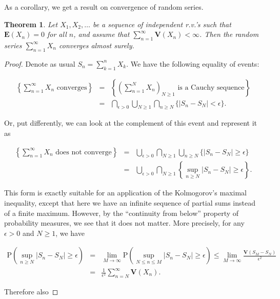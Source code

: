 \documentclass[11pt]{report}
\theoremstyle{plain}
\newtheorem{thm}{Theorem}[chapter]
\theoremstyle{definition}
\begin{document}
\noindent As a corollary, we get a result on convergence of
random series.

\begin{thm}
\label{thm-one-series}
Let $X_1,X_2,\ldots$ be a sequence of independent
r.v.'s such that $\mathbf{E}(X_n)=0$ for all $n$, and
assume that
$\sum_{n=1}^\infty \mathbf{V}(X_n) < \infty$. Then
the random series $\sum_{n=1}^\infty X_n$ converges
almost surely.
\end{thm}

\begin{proof}
Denote as usual $S_n = \sum_{k=1}^n X_k$. We have the
following equality of events:

\begin{eqnarray*}
\left\{ \sum_{n=1}^\infty X_n\textrm{ converges}
\right\}
&=&
\left\{ \left(\sum_{n=1}^N X_n\right)_{N\ge 1} \textrm{ is a Cauchy sequence}
\right\} \\
&=&
\bigcap_{\epsilon>0}
\bigcup_{N\ge 1}
\bigcap_{n\ge N}
\Big\{
|S_n-S_N|<\epsilon
\Big\}.
\end{eqnarray*}

\noindent Or, put differently, we can look at the complement of
this event and represent it as

\begin{eqnarray*}
\left\{ \sum_{n=1}^\infty X_n\textrm{ does not converge}
\right\}
&=&
\bigcup_{\epsilon>0}
\bigcap_{N\ge 1}
\bigcup_{n\ge N}
\Big\{
|S_n-S_N|\ge\epsilon
\Big\} \\
&=&
\bigcup_{\epsilon>0}
\bigcap_{N\ge 1}
\left\{ \sup_{n\ge N}
|S_n-S_N|\ge\epsilon
\right\}.
\end{eqnarray*}

\noindent This form is exactly suitable for an application of
the Kolmogorov's maximal inequality, except that here
we have an infinite sequence of partial sums instead
of a finite maximum. However, by the ``continuity from
below'' property of probability measures, we see that
it does not matter. More precisely, for any
$\epsilon>0$ and $N\ge 1$, we have

\begin{eqnarray*}
\mathrm{P}\left(
\sup_{n\ge N}
|S_n-S_N|\ge\epsilon
\right) &=& \lim_{M\to\infty} \mathrm{P}\left(
\sup_{N\le n\le M}
|S_n-S_N|\ge\epsilon
\right) \le \lim_{M\to\infty} \frac{\mathbf{V}(S_M-S_N)}{\epsilon^2} \\ &=& \frac{1}{\epsilon^2} \sum_{n=N}^\infty \mathbf{V}(X_n).
\end{eqnarray*}

\noindent Therefore also


\end{proof}
\end{document}
